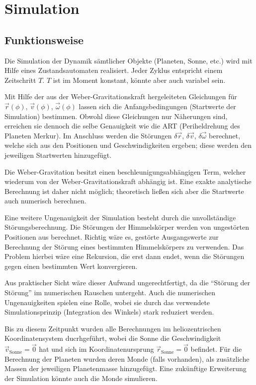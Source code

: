 \documentclass{book}
\begin{document}
\chapter{Simulation}
\vfill
\section{Funktionsweise}
Die Simulation der Dynamik sämtlicher Objekte (Planeten, Sonne, etc.) wird mit Hilfe eines Zustandsautomaten
realisiert. Jeder Zyklus entspricht einem Zeitschritt $T$. $T$ ist im Moment konstant, könnte aber auch variabel sein.

Mit Hilfe der aus der Weber-Gravitationskraft hergeleiteten Gleichungen für $\vec{r}(\phi)$, $\vec{v}(\phi)$, $\vec{\omega}(\phi)$
lassen sich die Anfangsbedingungen (Startwerte der Simulation) bestimmen. Obwohl diese Gleichungen nur Näherungen sind,
erreichen sie dennoch die selbe Genauigkeit wie die ART (Periheldrehung des Planeten Merkur). Im Anschluss werden die Störungen
$\delta\vec{r}$, $\delta\vec{v}$, $\delta\vec{\omega}$ berechnet, welche sich aus den Positionen und Geschwindigkeiten ergeben;
diese werden den jeweiligen Startwerten hinzugefügt.

Die Weber-Gravitation besitzt einen beschleunigungsabhängigen Term, welcher wiederum von der Weber-Gravitationskraft abhängig ist.
Eine exakte analytische Berechnung ist daher nicht möglich; theoretisch ließen sich aber die Startwerte auch numerisch berechnen.

Eine weitere Ungenauigkeit der Simulation besteht durch die unvollständige Störungsberechnung. Die Störungen der Himmelskörper werden
von ungestörten Positionen aus berechnet. Richtig wäre es, gestörte Ausgangswerte zur Berechnung der Störung eines bestimmten
Himmelskörpers zu verwenden. Das Problem hierbei wäre eine Rekursion, die erst dann endet, wenn die Störungen gegen einen bestimmten
Wert konvergieren.

Aus praktischer Sicht wäre dieser Aufwand ungerechtfertigt, da die \enquote{Störung der Störung} im numerischen Rauschen untergeht.
Auch die numerischen Ungenauigkeiten spielen eine Rolle, wobei sie durch das verwendete Simulationsprinzip (Integration des Winkels)
stark reduziert werden.

Bis zu diesem Zeitpunkt wurden alle Berechnungen im heliozentrischen Koordinatensystem ducrhgeführt, wobei die Sonne die
Geschwindigkeit $\vec{v}_\text{Sonne} = \vec{0}$ hat und sich im Koordinatenursprung $\vec{r}_\text{Sonne} = \vec{0}$ befindet.
Für die Berechnung der Planeten wurden deren Monde (falls vorhanden), als zusätzliche Massen der jeweiligen Planetenmasse hinzugefügt.
Eine zukünftige Erweiterung der Simulation könnte auch die Monde simulieren.
\end{document}
